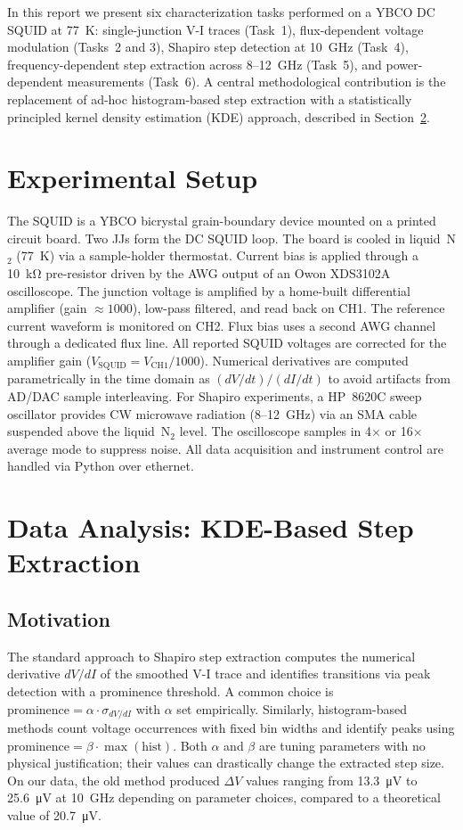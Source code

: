 \documentclass[12pt,a4paper]{article}
\begin{document}
In this report we present six characterization tasks performed on a YBCO DC SQUID
at \SI{77}{\kelvin}: single-junction V-I traces (Task~1), flux-dependent voltage
modulation (Tasks~2 and 3), Shapiro step detection at \SI{10}{\giga\hertz}
(Task~4), frequency-dependent step extraction across 8--12~GHz (Task~5), and
power-dependent measurements (Task~6). A central methodological contribution is the
replacement of ad-hoc histogram-based step extraction with a statistically
principled kernel density estimation (KDE) approach, described in
Section~\ref{sec:kde}.


\section{Experimental Setup}

The SQUID is a YBCO bicrystal grain-boundary device mounted on a printed circuit
board. Two JJs form the DC SQUID loop. The board is cooled in liquid~N$_2$
(\SI{77}{\kelvin}) via a sample-holder thermostat. Current bias is applied through a
\SI{10}{\kilo\ohm} pre-resistor driven by the AWG output of an Owon XDS3102A
oscilloscope. The junction voltage is amplified by a home-built differential
amplifier (gain $\approx 1000$), low-pass filtered, and read back on CH1.
The reference current waveform is monitored on CH2. Flux bias uses a second AWG
channel through a dedicated flux line. All reported SQUID voltages are corrected for
the amplifier gain ($V_\mathrm{SQUID} = V_\mathrm{CH1}/1000$). Numerical derivatives
are computed parametrically in the time domain as $(dV/dt)/(dI/dt)$ to avoid
artifacts from AD/DAC sample interleaving. For Shapiro experiments, a HP~8620C sweep
oscillator provides CW microwave radiation (8--12~GHz) via an SMA cable suspended
above the liquid~N$_2$ level. The oscilloscope samples in 4$\times$ or 16$\times$
average mode to suppress noise. All data acquisition and instrument control are
handled via Python over ethernet.


\section{Data Analysis: KDE-Based Step Extraction}
\label{sec:kde}

\subsection{Motivation}

The standard approach to Shapiro step extraction computes the numerical derivative
$dV/dI$ of the smoothed V-I trace and identifies transitions via peak detection with
a prominence threshold. A common choice is
$\text{prominence} = \alpha \cdot \sigma_{dV/dI}$
with $\alpha$ set empirically. Similarly, histogram-based methods count voltage
occurrences with fixed bin widths and identify peaks using
$\text{prominence} = \beta \cdot \max(\text{hist})$. Both $\alpha$ and $\beta$ are
tuning parameters with no physical justification; their values can drastically change
the extracted step size. On our data, the old method produced $\Delta V$ values
ranging from \SI{13.3}{\micro\volt} to \SI{25.6}{\micro\volt} at \SI{10}{\giga\hertz}
depending on parameter choices, compared to a theoretical value of
\SI{20.7}{\micro\volt}.
\end{document}
